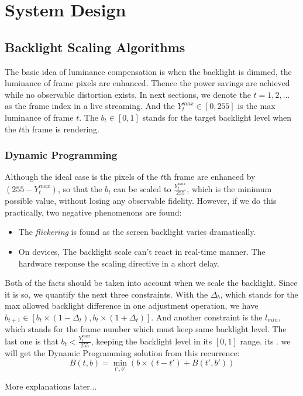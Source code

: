 \section{System Design}
\label{sec:design}
\subsection{Backlight Scaling Algorithms}
The basic idea of luminance compensation is when the backlight is
dimmed, the luminance of frame pixels are enhanced. Thence the power
savings are achieved while no observable distortion exists. In next
sections, we denote the $t = 1, 2, ...$ as the frame index in a live
streaming. And the $Y_{t}^{max} \in [0, 255]$ is the max luminance of
frame $t$. The $b_{t} \in [0, 1]$ stands for the target backlight
level when the $t$th frame is rendering.

\subsubsection{Dynamic Programming}
Although the ideal case is the pixels of the $t$th frame are enhanced by
$(255 - Y_{t}^{max})$, so that the $b_{t}$ can be scaled to
$\frac{Y_{t}^{max}}{255}$, which is the minimum possible value, 
without losing any observable fidelity. However, if we do this
practically, two negative phenomenons are found:
\begin{itemize}
  \item{The {\it flickering} is found as the screen backlight varies
    dramatically.}
  \item{On devices, The backlight scale can't react in real-time
    manner. The hardware response the scaling directive in a short
    delay.}
\end{itemize}
Both of the facts should be taken into account when we scale the
backlight. Since it is so, we quantify the next three
constraints. With the $\Delta_{b}$, which stands for the max allowed
backlight difference in one adjustment operation, we have
$b_{t+1} \in [b_t \times (1 - \Delta_t), b_t \times (1 + \Delta_t)]$.  And another
constraint is the $l_{min}$, which stands for the frame number which
must keep same backlight level. The last one is that $b_{t} <
\frac{Y_{t}^{max}}{255}$, keeping the backlight level in its $[0,1]$
range.  its . we will get the Dynamic Programming solution from this
recurrence:
$$ B(t,b) = \min_{t',b'}(b \times (t - t') + B(t', b')) $$

More explanations later...

